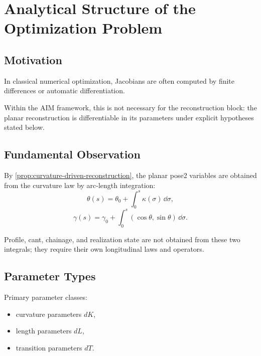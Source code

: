 
\section{Analytical Structure of the Optimization Problem}

\subsection{Motivation}

In classical numerical optimization, Jacobians are often computed by
finite differences or automatic differentiation.

Within the AIM framework, this is not necessary for the reconstruction
block: the planar reconstruction is differentiable in its parameters
under explicit hypotheses stated below.

\subsection{Fundamental Observation}

\begin{corollary}
\label{cor:planar-reconstruction-integrals}
By \cref{prop:curvature-driven-reconstruction}, the planar pose2 variables
are obtained from the curvature law by arc-length integration:
\[
\theta(s) = \theta_0 + \int_0^s \kappa(\sigma)\,\dd\sigma,
\]
\[
\gamma(s) = \gamma_0 + \int_0^s (\cos\theta,\sin\theta)\,\dd\sigma.
\]
\end{corollary}

Profile, cant, chainage, and realization state are not obtained from these
two integrals; they require their own longitudinal laws and operators.

\subsection{Parameter Types}

\begin{definition}
Primary parameter classes:
\begin{itemize}
\item curvature parameters \(dK\),
\item length parameters \(dL\),
\item transition parameters \(dT\).
\end{itemize}
\end{definition}

